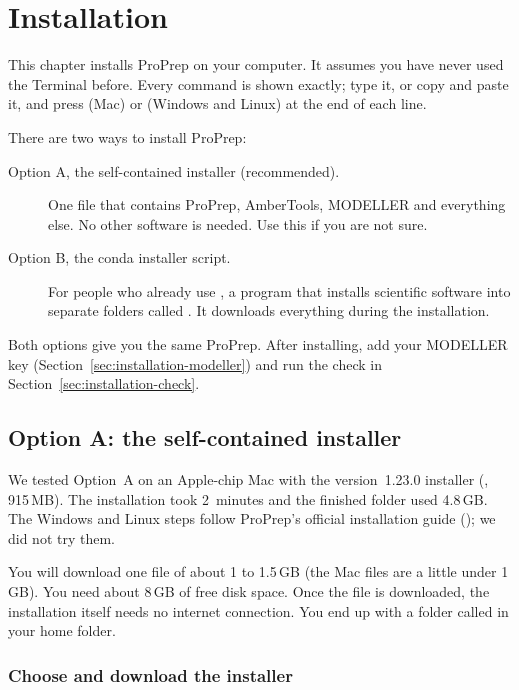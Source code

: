 \chapter{Installation}
\label{ch:installation}

This chapter installs ProPrep on your computer. It assumes you have never used
the Terminal before. Every command is shown exactly; type it, or copy and paste
it, and press  (Mac) or  (Windows and Linux) at the end of
each line.

There are two ways to install ProPrep:
\begin{description}
  \item[Option A, the self-contained installer (recommended).] One file that
        contains ProPrep, AmberTools, MODELLER and everything else. No other
        software is needed. Use this if you are not sure.
  \item[Option B, the conda installer script.] For people who already use
        , a program that installs scientific software into separate
        folders called . It downloads everything
        during the installation.
\end{description}

Both options give you the same ProPrep. After installing, add your MODELLER key
(Section~\ref{sec:installation-modeller}) and run the check in
Section~\ref{sec:installation-check}.

\section{Option A: the self-contained installer}
\label{sec:installation-optiona}

We tested Option~A on an Apple-chip Mac with the version~1.23.0 installer
(, 915\,MB). The installation took
2~minutes and the finished  folder used 4.8\,GB. The Windows
and Linux steps follow ProPrep's official installation guide
(); we did not try them.

You will download one file of about 1 to 1.5\,GB (the Mac files are a little
under 1\,GB). You need about 8\,GB of free disk space. Once the file is
downloaded, the installation itself needs no internet connection. You end up
with a folder called  in your home folder.

\subsection{Choose and download the installer}

